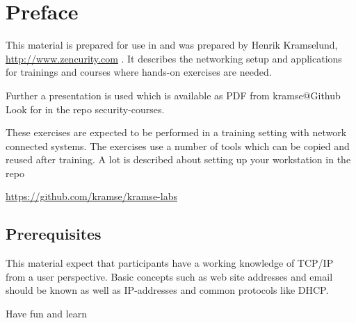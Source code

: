 \documentclass[a4paper,11pt,notitlepage]{report}
\begin{document}
\rm
{}

\newcommand{\kursus}[1]{Introduction to Incident Response Elective, KEA}
\newcommand{\kursusnavn}[1]{Introduction to Incident Response Elective, KEA\\ exercises}


\setcounter{tocdepth}{0}

\normal

{\color{titlecolor}\tableofcontents}

\normal
\pagestyle{fancyplain}
\chapter*{\color{titlecolor}Preface}

This material is prepared for use in \emph{\kursus} and was prepared by
Henrik Kramselund, \url{http://www.zencurity.com} .
It describes the networking setup and
applications for trainings and courses where hands-on exercises are needed.

Further a presentation is used which is available as PDF from kramse@Github\\
Look for \jobname in the repo security-courses.

These exercises are expected to be performed in a training setting with network connected systems. The exercises use a number of tools which can be copied and reused after training. A lot is described about setting up your workstation in the repo

\url{https://github.com/kramse/kramse-labs}


\section*{\color{titlecolor}Prerequisites}

This material expect that participants have a working knowledge of
TCP/IP from a user perspective. Basic concepts such as web site addresses and email should be known as well as IP-addresses and common protocols like DHCP.

\vskip 1cm
Have fun and learn
\eject

\rhead{\fancyplain{}{\bf \chaptername\ \thechapter}}

\end{document}
